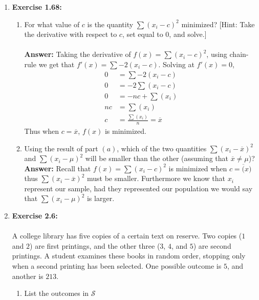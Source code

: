 \documentclass[12pt]{article}
\theoremstyle{homework}
\begin{document}
\begin{enumerate}
\item\hspace{.5in}\textbf{Exercise 1.68:}\\
\begin{enumerate}
\item For what value of $c$ is the quantity $\sum (x_i - c)^2$ minimized? [Hint: Take the derivative with respect to $c$, set equal to $0$, and solve.]\\
\\
 \textbf{Answer:}
 Taking the derivative of $f(x) = \sum (x_i - c)^2$, using chain-rule we get that $f'(x) = \sum -2(x_i - c)$. Solving at $f'(x) = 0$,
 \begin{align*}
  0 &=\sum -2(x_i - c)\\
  0 &=-2\sum (x_i - c)\\
  0 &=-nc + \sum (x_i)\\
  nc &= \sum (x_i)\\
  c &=\frac{\sum (x_i)}{n} = \overline{x}
 \end{align*}
 Thus when $c = \overline{x}$, $f(x)$ is minimized.
\vspace{.5in}
\item Using the result of part $(a)$, which of the two quantities $\sum (x_i -\overline{x})^2$ and $\sum(x_i -\mu)^2$ will be smaller than the other (assuming that $\overline{x} \neq \mu$)?\\

 \textbf{Answer:} Recall that $f(x) = \sum (x_i - c)^2$ is minimized when $c = \overline(x)$ thus $\sum (x_i -\overline{x})^2$ must be smaller. Furthermore
 we know that $x_i$ represent our sample, had they represented our population we would say that $\sum(x_i -\mu)^2$ is larger.    
\end{enumerate}
\vspace{1in}










\item\hspace{.5in}\textbf{Exercise 2.6:} \\
\\
A college library has five copies of a certain text on reserve. Two copies ($1$ and $2$) are first printings, and the other three ($3$, $4$, and $5$) are second printings. A student examines these books in random order, stopping only when a second printing has been selected. One possible outcome is $5$, and another is $213$.
\begin{enumerate}
\item List the outcomes in $\mathcal{S}$\\


\end{enumerate}
\end{enumerate}
\end{document}
